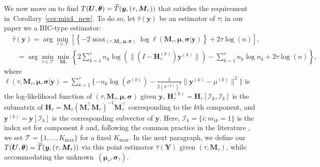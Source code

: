\documentclass[12pt]{article}
\theoremstyle{shortspace}
\def\*#1{\bm{#1}}
\def\btheta{\mathop{\theta\kern-.45em\hbox{$\theta$}}\nolimits}
\begin{document}
We now move on to find  $T(\*U, \btheta) = \widetilde T(\*y,  (\tau,{\*M_\tau}))$ that satisfies the requirement in~Corollary~\ref{cor:mix4_new}. 
To do so, let $\hat\tau(\*y) $ be an 
estimator of $\tau$; in our paper we a BIC-type estimator:
\begin{align}
    & \hat \tau(\*y)  = \arg\min_{\tau  \in {\mathcal T}}\left[\left\{-2 \max\nolimits_{(\tau, \*M _\tau, {\bm \mu }, \*\sigma ) } \log \ell(\*M _\tau, {\*\mu }, \*\sigma |\*y)\right\} + 2\tau  \log(n)\right], \nonumber \\
    & \,\,\,\, =  \arg\min_{\tau  \in {\mathcal T}} \min_{\*M _\tau}\left\{2\sum\nolimits_{k=1}^{\tau } n_k\log\left(\|(I - \*H_{\tau}^{(k)})\*y^{ (k)}\|\right) - \sum\nolimits_{k=1}^{\tau }n_k\log n_k + 2\tau  \log(n) \right\}, \label{eq:BIC-est}
\end{align}
where 
$\ell(\tau, \*M _\tau, {\bm \mu} , \*\sigma |\*y ) = \sum\nolimits_{k=1}^{\tau } \{-n_k\log(\sigma^{(k)})  -\frac{1}{2(\sigma^{(k)})^2} \|\*y^{ (k)} - \mu^{(k)}\|^2\}$ is the log-likelihood function of {\small $(\tau, \*M _\tau, {\bm \mu }, \*\sigma )$} given {\small $\*y$,}   $\*H_\tau^{(k)}$$=$$ \*H_\tau[\mathcal I_k, \mathcal I_k]$ is the submatrix of $\*H_\tau = {\*M}_{\tau} ({\*M}_{\tau}^\top {\*M}_{\tau})^{-1}{\*M}_{\tau}^\top$ corresponding to the $k$th component, and ${\*y}^{ (k)} = \*y [\mathcal I_k]$ is the corresponding subvector of $\*y $. Here, $\mathcal I_k=\{i: m_{ik}=1\}$ is the index set
for component $k$ and, following the common practice in the literature \citep[cf.,][]{Chen2017, FraleyRaftery1998, FraleyRaftery2002}, we set ${\mathcal T} = \{1, \dots, K_{\max}\}$ for a fixed $K_{\max}$.
In the next paragraph,  we define our $T(\*U, \btheta) = \widetilde T(\*y,  (\tau,{\*M_\tau}))$ via this point estimator ${\hat\tau}(\*Y )$ given $ (\tau, \*M_\tau)$, 
while accommodating the unknown~$(\*\mu_\tau, \*\sigma_\tau)$. 
\end{document}
